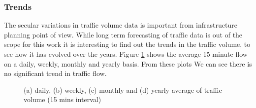 \subsubsection{Trends}
The secular variations in traffic volume data is important from infrastructure planning point of
view. While long term forecasting of traffic data is out of the scope for this work it is interesting
to find out the trends in the traffic volume, to see how it has evolved over the years.
Figure \ref{fig:AverageTrafficVolume} shows the average 15 minute flow on a daily, weekly,
monthly and yearly basis. From these plots We can see there is no significant trend in traffic flow.


\begin{figure}[h]
    \centering
    \qquad

    \qquad

    \caption[Average Traffic Volume]{(a) daily, (b) weekly, (c) monthly and (d) yearly average of
    traffic volume (15 mins interval)}
   \label{fig:AverageTrafficVolume}
\end{figure}

